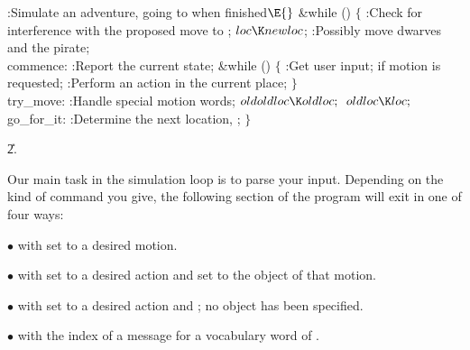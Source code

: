 \Y\B\4:Simulate an adventure, going to  when finished\X${}\E{}$\6
\&{while} ()\5
${}\{{}$\1\6
:Check for interference with the proposed move to \X;\6
${}\\{loc}\K\\{newloc}{}$;\6
:Possibly move dwarves and the pirate\X;\6
\4\\{commence}:\5
:Report the current state\X;\6
\&{while} ()\5
${}\{{}$\1\6
:Get user input;  if motion is requested\X;\6
:Perform an action in the current place\X;\6
\4${}\}{}$\2\6
\4\\{try\_move}:\5
:Handle special motion words\X;\6
${}\\{oldoldloc}\K\\{oldloc};{}$\6
${}\\{oldloc}\K\\{loc};{}$\6
\4\\{go\_for\_it}:\5
:Determine the next location, \X;\6
\4${}\}{}$\2\par
\U2.\fi

Our main task in the simulation loop is to parse your input.
Depending on the kind of command you give, the following section
of the program will exit in one of four ways:

\smallskip
\item{$\bullet$}  with  set to a desired motion.

\item{$\bullet$}  with  set to a desired action
and  set to the object of that motion.

\item{$\bullet$}  with  set to a desired action
and ; no object has been specified.

\item{$\bullet$}  with  the
index of a message for a vocabulary word of .

